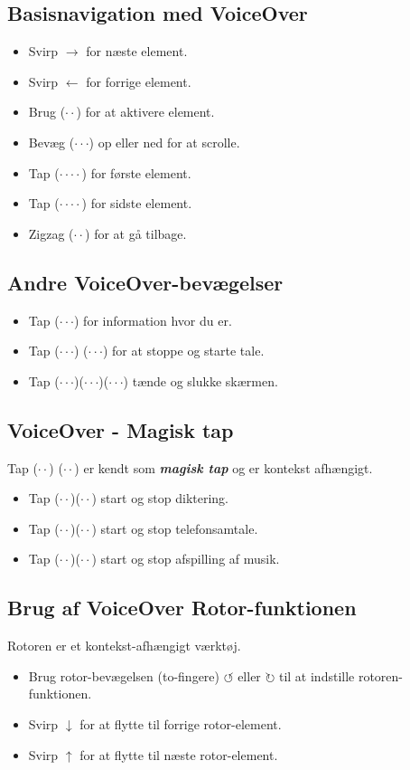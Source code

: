 \documentclass[a4paper, landscape, 10pt]{scrartcl}
\begin{document}
\begin{multicols}{2}
\subsection*{Basisnavigation med VoiceOver}
\begin{itemize}
  \item{Svirp $\rightarrow$ for næste element.}
  \item{Svirp $\leftarrow$ for forrige element.}
  \item{Brug ($\cdot\cdot$) for at aktivere element.}
  \item{Bevæg ($\cdot\cdot\cdot$) op eller ned for at scrolle.}
  \item{Tap ($\cdot\cdot\cdot\cdot$) for første element.}
  \item{Tap ($\cdot\cdot\cdot\cdot$) for sidste element.}
  \item{Zigzag ($\cdot\cdot$) for at gå tilbage.}
\end{itemize}

\subsection*{Andre VoiceOver-bevægelser}
\begin{itemize}
  \item{Tap ($\cdot\cdot\cdot$) for information hvor du er.}
  \item{Tap ($\cdot\cdot\cdot$) ($\cdot\cdot\cdot$) for at stoppe og starte tale.}
  \item{Tap ($\cdot\cdot\cdot$)($\cdot\cdot\cdot$)($\cdot\cdot\cdot$) tænde og slukke skærmen.}
\end{itemize}

\subsection*{VoiceOver - Magisk tap}
Tap ($\cdot\cdot$) ($\cdot\cdot$) er kendt som  \textbf{\textit{magisk tap}} og er kontekst afhængigt.
\begin{itemize}
  \item{Tap ($\cdot\cdot$)($\cdot\cdot$) start og stop diktering.}
  \item{Tap ($\cdot\cdot$)($\cdot\cdot$) start og stop telefonsamtale.}
  \item{Tap ($\cdot\cdot$)($\cdot\cdot$) start og stop afspilling af musik.}
\end{itemize}

\subsection*{Brug af VoiceOver Rotor-funktionen}
Rotoren er et kontekst-afhængigt værktøj. 
\begin{itemize}
  \item{Brug rotor-bevægelsen (to-fingere) $\circlearrowleft{}$ eller $\circlearrowright$ til at indstille rotoren-funktionen.}
  \item{Svirp $\downarrow$ for at flytte til forrige rotor-element.}
  \item{Svirp $\uparrow$ for at flytte til næste rotor-element.}
\end{itemize}


\end{multicols}
\end{document}
